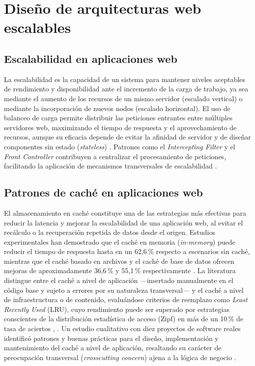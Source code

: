 \section{Diseño de arquitecturas web escalables}

\subsection{Escalabilidad en aplicaciones web}

La escalabilidad es la capacidad de un sistema para mantener niveles aceptables de rendimiento y disponibilidad ante el incremento de la carga de trabajo, ya sea mediante el aumento de los recursos de un mismo servidor (escalado vertical) o mediante la incorporación de nuevos nodos (escalado horizontal). El uso de balanceo de carga permite distribuir las peticiones entrantes entre múltiples servidores web, maximizando el tiempo de respuesta y el aprovechamiento de recursos, aunque su eficacia depende de evitar la afinidad de servidor y de diseñar componentes sin estado (\textit{stateless}) \cite{guidance_share}. Patrones como el \textit{Intercepting Filter} y el \textit{Front Controller} contribuyen a centralizar el procesamiento de peticiones, facilitando la aplicación de mecanismos transversales de escalabilidad \cite{guidance_share}.

\subsection{Patrones de caché en aplicaciones web}

El almacenamiento en caché constituye una de las estrategias más efectivas para reducir la latencia y mejorar la escalabilidad de una aplicación web, al evitar el recálculo o la recuperación repetida de datos desde el origen. Estudios experimentales han demostrado que el caché en memoria (\textit{in-memory}) puede reducir el tiempo de respuesta hasta en un 62,6\,\% respecto a escenarios sin caché, mientras que el caché basado en archivos y el caché de base de datos ofrecen mejoras de aproximadamente 36,6\,\% y 55,1\,\% respectivamente \cite{researchgate_caching}. La literatura distingue entre el caché a nivel de aplicación —insertado manualmente en el código base y sujeto a errores por su naturaleza transversal— y el caché a nivel de infraestructura o de contenido, evaluándose criterios de reemplazo como \textit{Least Recently Used} (LRU), cuyo rendimiento puede ser superado por estrategias conscientes de la distribución estadística de acceso (Zipf) en más de un 10\,\% de tasa de aciertos \cite{ieee_webcaching}, \cite{acm_caching}. Un estudio cualitativo con diez proyectos de software reales identificó patrones y buenas prácticas para el diseño, implementación y mantenimiento del caché a nivel de aplicación, resaltando su carácter de preocupación transversal (\textit{crosscutting concern}) ajena a la lógica de negocio \cite{ieee_tse_caching}.

